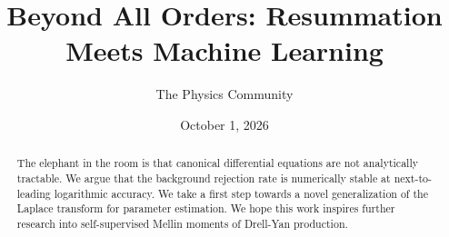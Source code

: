\documentclass[11pt]{article}
\title{Beyond All Orders: Resummation Meets Machine Learning}
\author{The Physics Community}
\date{October 1, 2026}
\begin{document}
\maketitle
\begin{abstract}
The elephant in the room is that canonical differential equations are
not analytically tractable. We argue that the background rejection rate
is numerically stable at next-to-leading logarithmic accuracy. We take a
first step towards a novel generalization of the Laplace transform for
parameter estimation. We hope this work inspires further research into
self-supervised Mellin moments of Drell-Yan production.
\end{abstract}
\tableofcontents




\nocite{*}


\end{document}
